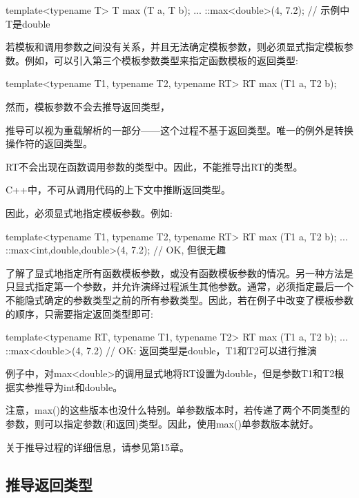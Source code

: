 \begin{cpp}
template<typename T>
T max (T a, T b);
...
::max<double>(4, 7.2); // 示例中T是double
\end{cpp}

若模板和调用参数之间没有关系，并且无法确定模板参数，则必须显式指定模板参数。例如，可以引入第三个模板参数类型来指定函数模板的返回类型:

\begin{cpp}
template<typename T1, typename T2, typename RT>
RT max (T1 a, T2 b);
\end{cpp}

然而，模板参数不会去推导返回类型，

\begin{notice}
推导可以视为重载解析的一部分——这个过程不基于返回类型。唯一的例外是转换操作符的返回类型。
\end{notice}

RT不会出现在函数调用参数的类型中。因此，不能推导出RT的类型。

\begin{notice}
C++中，不可从调用代码的上下文中推断返回类型。
\end{notice}

因此，必须显式地指定模板参数。例如:

\begin{cpp}
template<typename T1, typename T2, typename RT>
RT max (T1 a, T2 b);
...
::max<int,double,double>(4, 7.2); // OK, 但很无趣
\end{cpp}

了解了显式地指定所有函数模板参数，或没有函数模板参数的情况。另一种方法是只显式指定第一个参数，并允许演绎过程派生其他参数。通常，必须指定最后一个不能隐式确定的参数类型之前的所有参数类型。因此，若在例子中改变了模板参数的顺序，只需要指定返回类型即可:

\begin{cpp}
template<typename RT, typename T1, typename T2>
RT max (T1 a, T2 b);
...
::max<double>(4, 7.2) // OK: 返回类型是double，T1和T2可以进行推演
\end{cpp}

例子中，对max<double>的调用显式地将RT设置为double，但是参数T1和T2根据实参推导为int和double。

注意，max()的这些版本也没什么特别。单参数版本时，若传递了两个不同类型的参数，则可以指定参数(和返回)类型。因此，使用max()单参数版本就好。

关于推导过程的详细信息，请参见第15章。

\subsection{推导返回类型}

